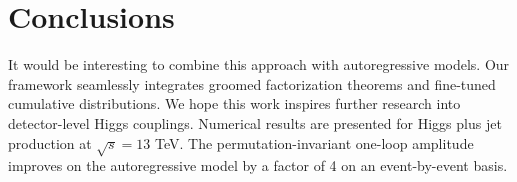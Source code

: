 \section{Conclusions}\label{sec:conclusions}

It would be interesting to combine this approach with autoregressive
models. Our framework seamlessly integrates groomed factorization
theorems and fine-tuned cumulative distributions. We hope this work
inspires further research into detector-level Higgs couplings. Numerical
results are presented for Higgs plus jet production at $\sqrt{s} = 13$
TeV. The permutation-invariant one-loop amplitude improves on the
autoregressive model by a factor of 4 on an event-by-event basis.

